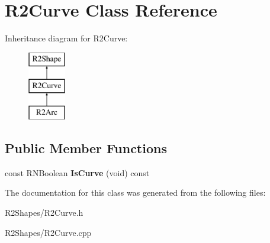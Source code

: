 \hypertarget{class_r2_curve}{}\section{R2\+Curve Class Reference}
\label{class_r2_curve}
Inheritance diagram for R2\+Curve\+:\begin{figure}[H]
\begin{center}
\leavevmode
\includegraphics[height=3.000000cm]{class_r2_curve}
\end{center}
\end{figure}
\subsection*{Public Member Functions}
\begin{DoxyCompactItemize}
\item 
const R\+N\+Boolean {\bfseries Is\+Curve} (void) const \hypertarget{class_r2_curve_a161ea347c738099e4d2ae8a92129cec7}{}\label{class_r2_curve_a161ea347c738099e4d2ae8a92129cec7}

\end{DoxyCompactItemize}


The documentation for this class was generated from the following files\+:\begin{DoxyCompactItemize}
\item 
R2\+Shapes/R2\+Curve.\+h\item 
R2\+Shapes/R2\+Curve.\+cpp\end{DoxyCompactItemize}
